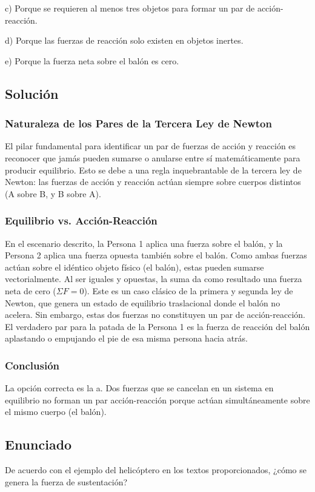 \documentclass[12pt]{article}
\begin{document}
c) Porque se requieren al menos tres objetos para formar un par de acción-reacción.

d) Porque las fuerzas de reacción solo existen en objetos inertes.

e) Porque la fuerza neta sobre el balón es cero.

\subsection*{Solución}

\subsubsection*{Naturaleza de los Pares de la Tercera Ley de Newton}
El pilar fundamental para identificar un par de fuerzas de acción y reacción es reconocer que jamás pueden sumarse o anularse entre sí matemáticamente para producir equilibrio. Esto se debe a una regla inquebrantable de la tercera ley de Newton: las fuerzas de acción y reacción actúan siempre sobre cuerpos distintos (A sobre B, y B sobre A).

\subsubsection*{Equilibrio vs. Acción-Reacción}
En el escenario descrito, la Persona 1 aplica una fuerza sobre el balón, y la Persona 2 aplica una fuerza opuesta también sobre el balón. Como ambas fuerzas actúan sobre el idéntico objeto físico (el balón), estas pueden sumarse vectorialmente. Al ser iguales y opuestas, la suma da como resultado una fuerza neta de cero ($\Sigma F = 0$). Este es un caso clásico de la primera y segunda ley de Newton, que genera un estado de equilibrio traslacional donde el balón no acelera.
Sin embargo, estas dos fuerzas no constituyen un par de acción-reacción. El verdadero par para la patada de la Persona 1 es la fuerza de reacción del balón aplastando o empujando el pie de esa misma persona hacia atrás. 

\subsubsection*{Conclusión}
La opción correcta es la a. Dos fuerzas que se cancelan en un sistema en equilibrio no forman un par acción-reacción porque actúan simultáneamente sobre el mismo cuerpo (el balón).

\newpage
\subsection*{Enunciado}
De acuerdo con el ejemplo del helicóptero en los textos proporcionados, ¿cómo se genera la fuerza de sustentación?
\end{document}
